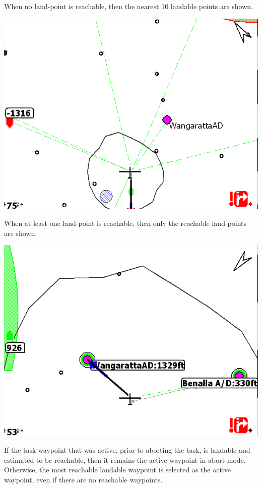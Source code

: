 \documentclass[a4paper,12pt]{refrep}
\begin{document}
When no land-point is reachable, then the nearest 10 landable points
are shown. 

\begin{center}
\includegraphics[angle=0,width=\linewidth,keepaspectratio='true']{figures/abort-low.png}
\end{center}

When at least one land-point is reachable, then only the reachable land-points are shown.

\begin{center}
\includegraphics[angle=0,width=\linewidth,keepaspectratio='true']{figures/abort-high.png}
\end{center}

If the task waypoint that was active, prior to aborting the task, is
landable and estimated to be reachable, then it remains the active
waypoint in abort mode.  Otherwise, the most reachable landable
waypoint is selected as the active waypoint, even if there are no
reachable waypoints.
\end{document}
